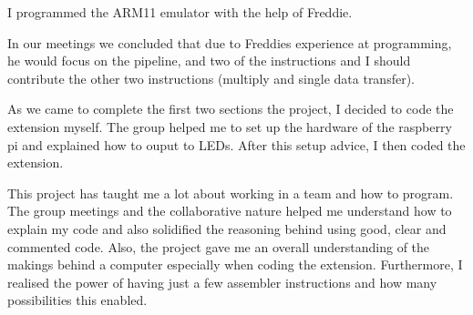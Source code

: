I programmed the ARM11 emulator with the help of Freddie. 

In our meetings we concluded that due to Freddies experience at programming, he would focus on the pipeline, and two of the instructions and I should contribute the other two instructions (multiply and single data transfer).

As we came to complete the first two sections the project, I decided to code the extension myself. The group helped me to set up the hardware of the raspberry pi and explained how to ouput to LEDs. After this setup advice, I then coded the extension. 

This project has taught me a lot about working in a team and how to program. The group meetings and the collaborative nature helped me understand how to explain my code and also solidified the reasoning behind using good, clear and commented code. Also, the project gave me an overall understanding of the makings behind a computer especially when coding the extension. Furthermore, I realised the power of having just a few assembler instructions and how many possibilities this enabled.
